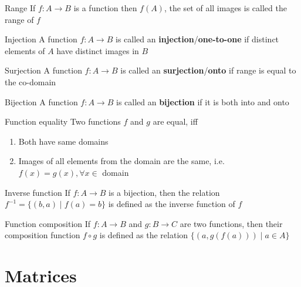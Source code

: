 \documentclass[titlepage, 12pt]{book}
\begin{document}
\begin{definition}{Range}{}
    If $f:A\rightarrow B$ is a function then $f(A)$, the set of all images is
    called the range of $f$
\end{definition}

\begin{definition}{Injection}{}
    A function $f:A\rightarrow B$ is called an
    \textbf{injection}/\textbf{one-to-one} if distinct elements of $A$ have
    distinct images in $B$
\end{definition}

\begin{definition}{Surjection}{}
    A function $f:A\rightarrow B$ is called an
    \textbf{surjection}/\textbf{onto} if range is equal to the co-domain
\end{definition}

\begin{definition}{Bijection}{}
    A function $f:A\rightarrow B$ is called an \textbf{bijection} if it is both
    into and onto
\end{definition}

\begin{definition}{Function equality}{}
    Two functions $f$ and $g$ are equal, iff
    \begin{enumerate}
        \item Both have same domains
        \item Images of all elements from the domain are the same, i.e. $f(x) =
            g(x), \forall x\in $ domain
    \end{enumerate}
\end{definition}

\begin{definition}{Inverse function}{}
    If $f:A\rightarrow B$ is a bijection, then the relation $f^{-1} = \{(b,
    a)\mid f(a) = b\}$ is defined as the inverse function of $f$
\end{definition}

\begin{definition}{Function composition}{}
    If $f : A\rightarrow B$ and $g : B\rightarrow C$ are two functions, then
    their composition function $f\circ g$ is defined as the relation $\{(a,
    g(f(a)))\mid a\in A\}$
\end{definition}

\chapter{Matrices}
\end{document}
